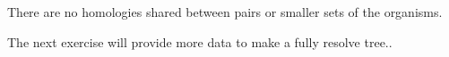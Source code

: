\documentclass[12pt, hidelinks]{exam}
\newcommand*\AnswerBox[2]{%
    \parbox[t][#1]{0.92\textwidth}{%
    \begin{solution}#2\end{solution}}
    \vspace{\stretch{1}}
}
\begin{document}
\begin{questions}
%		
%



\AnswerBox{3\baselineskip}{There are no homologies shared between pairs or smaller sets of the organisms.}

\end{questions}

 The next exercise will provide more data to make a fully resolve tree..
\end{document}
